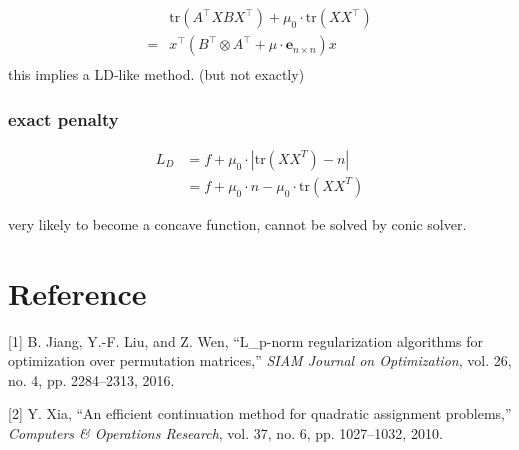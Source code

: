 \documentclass[
  10pt,
  a4paper,
,tablecaptionabove
]{scrartcl}
\newenvironment{cslreferences}%
  {}%
  {\par}
\begin{document}
\[\begin{aligned}
&\textrm{tr}(A^\top XB X^\top) + \mu_0 \cdot \textrm{tr}(X X^{\top}) \\
= & x^\top (B^\top \otimes A^\top + \mu\cdot  \mathbf e_{n\times n}) x\\ 
\end{aligned} \] this implies a LD-like method. (but not exactly)

\hypertarget{exact-penalty}{%
\subsubsection{exact penalty}\label{exact-penalty}}

\[\begin{aligned}
L_D & =  f  + \mu_0\cdot | \textrm{tr}(XX^T) -  n| \\
 &= f  + \mu_0\cdot n - \mu_0\cdot \textrm{tr}(XX^T)
\end{aligned}\]

very likely to become a concave function, cannot be solved by conic
solver.

\hypertarget{reference}{%
\section*{Reference}\label{reference}}

\hypertarget{refs}{}
\begin{cslreferences}
\leavevmode\hypertarget{ref-jiang_l_p-norm_2016}{}%
{[}1{]} B. Jiang, Y.-F. Liu, and Z. Wen, ``L\_p-norm regularization
algorithms for optimization over permutation matrices,'' \emph{SIAM
Journal on Optimization}, vol. 26, no. 4, pp. 2284--2313, 2016.

\leavevmode\hypertarget{ref-xia_efficient_2010}{}%
{[}2{]} Y. Xia, ``An efficient continuation method for quadratic
assignment problems,'' \emph{Computers \& Operations Research}, vol. 37,
no. 6, pp. 1027--1032, 2010.
\end{cslreferences}
\end{document}
